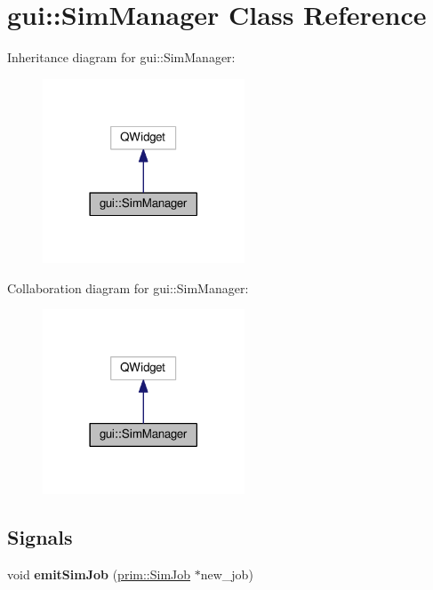 \hypertarget{classgui_1_1SimManager}{}\section{gui\+:\+:Sim\+Manager Class Reference}
\label{classgui_1_1SimManager}


Inheritance diagram for gui\+:\+:Sim\+Manager\+:\nopagebreak
\begin{figure}[H]
\begin{center}
\leavevmode
\includegraphics[width=170pt]{classgui_1_1SimManager__inherit__graph}
\end{center}
\end{figure}


Collaboration diagram for gui\+:\+:Sim\+Manager\+:\nopagebreak
\begin{figure}[H]
\begin{center}
\leavevmode
\includegraphics[width=170pt]{classgui_1_1SimManager__coll__graph}
\end{center}
\end{figure}
\subsection*{Signals}
\begin{DoxyCompactItemize}
\item 
void {\bfseries emit\+Sim\+Job} (\hyperlink{classprim_1_1SimJob}{prim\+::\+Sim\+Job} $\ast$new\+\_\+job)\hypertarget{classgui_1_1SimManager_a4bd86247aa29e413154e4146f2b9bf0e}{}\label{classgui_1_1SimManager_a4bd86247aa29e413154e4146f2b9bf0e}

\end{DoxyCompactItemize}
